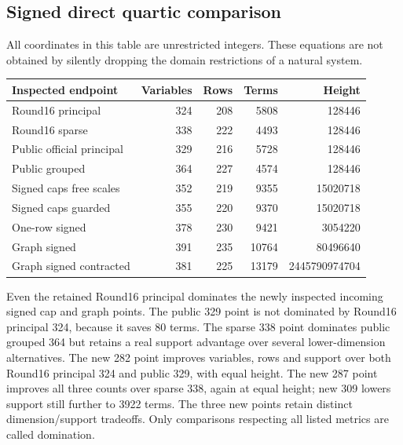 \subsection{Signed direct quartic comparison}
All coordinates in this table are unrestricted integers. These equations are not obtained by silently dropping the domain restrictions of a natural system.
\begin{center}\small
\begin{tabular}{@{}lrrrr@{}}\toprule
Inspected endpoint&Variables&Rows&Terms&Height\\\midrule
Round16 principal&324&208&5808&128446\\
Round16 sparse&338&222&4493&128446\\
Public official principal&329&216&5728&128446\\
Public grouped&364&227&4574&128446\\
Signed caps free scales&352&219&9355&15020718\\
Signed caps guarded&355&220&9370&15020718\\
One-row signed&378&230&9421&3054220\\
Graph signed&391&235&10764&80496640\\
Graph signed contracted&381&225&13179&2445790974704\\\bottomrule
\end{tabular}\end{center}
Even the retained Round16 principal dominates the newly inspected incoming signed cap and graph points. The public 329 point is not dominated by Round16 principal 324, because it saves 80 terms. The sparse 338 point dominates public grouped 364 but retains a real support advantage over several lower-dimension alternatives. The new 282 point improves variables, rows and support over both Round16 principal 324 and public 329, with equal height. The new 287 point improves all three counts over sparse 338, again at equal height; new 309 lowers support still further to 3922 terms. The three new points retain distinct dimension/support tradeoffs. Only comparisons respecting all listed metrics are called domination.

